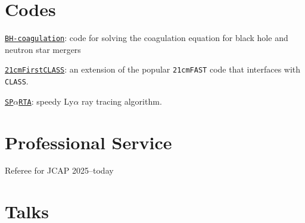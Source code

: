 \documentclass[letterpaper,12pt]{article}
\renewenvironment{itemize}{
  \begin{list}{}{
    \setlength{\leftmargin}{1.5em}
  }
}{
  \end{list}
}
\begin{document}
\vspace{-5mm}
\section*{Codes}

\begin{itemize}
	\item \href{https://github.com/jordanflitter/BH-coagulation}{\tt BH-coagulation}: code for solving the coagulation equation for black hole and neutron star mergers
	\item \href{https://github.com/jordanflitter/21cmFirstCLASS}{\tt 21cmFirstCLASS}: an extension of the popular {\tt 21cmFAST} code that interfaces with {\tt CLASS}.
	\item \href{https://github.com/jordanflitter/SPaRTA}{\tt SP$\alpha$RTA}: speedy Ly$\alpha$ ray tracing algorithm.
\end{itemize}

\vspace{-5mm}
\section*{Professional Service}

\begin{itemize}
	\item Referee for JCAP \hfill 2025--today
\end{itemize}

\vspace{-5mm}
\section*{Talks}
\end{document}
